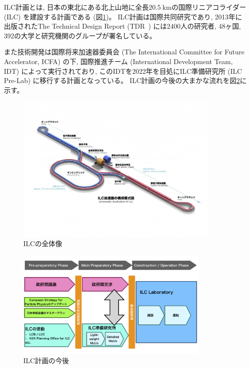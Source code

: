 ILC計画とは, 日本の東北にある北上山地に全長$20.5\ \mathrm{km}$の国際リニアコライダー (ILC) を建設する計画である (図\ref{2InternationalLinearCollider})。
ILC計画は国際共同研究であり, 2013年に出版されたThe Technical Design Report (TDR~\cite{ILCTDRVES}) には2400人の研究者, 48ヶ国, 392の大学と研究機関のグループが署名している。

また技術開発は国際将来加速器委員会 (The International Committee for Future Accelerator, ICFA) の下, 国際推進チーム (International Development Team, IDT) によって実行されており, このIDTを2022年を目処にILC準備研究所 (ILC Pre-Lab) に移行する計画となっている。
ILC計画の今後の大まかな流れを図\ref{3ILCProject}に示す。

\begin{figure}[htbp]
 \centering
  \includegraphics[trim = 0 100 0 100, width=0.9\textwidth, clip]{Figure/1Introduction/2InternationalLinearCollider.jpg}
  \caption[ILCの全体像]
                 {ILCの全体像~\cite{ILCPHOTO}}
  \label{2InternationalLinearCollider}
\end{figure}

\begin{figure}[htbp]
 \centering
 \includegraphics[width=0.85\textwidth]{Figure/1Introduction/3ILCProject.png}
 \caption[ILC計画の今後]
                {ILC計画の今後~\cite{RecommendationsonILCProjectImplementation}}
 \label{3ILCProject}
\end{figure}


